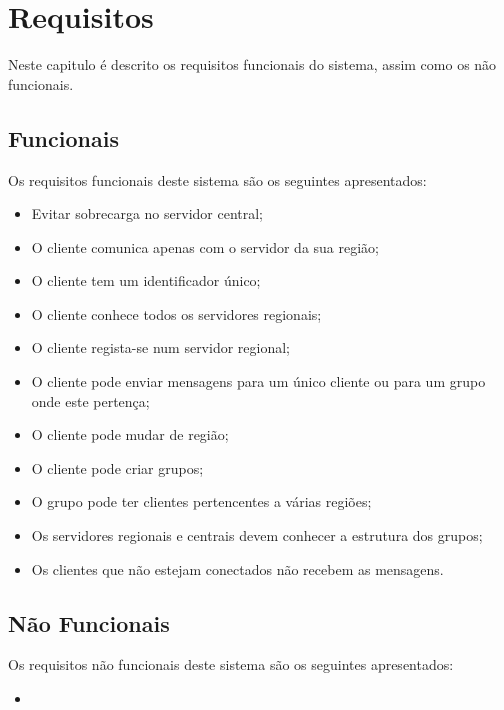 \chapter{Requisitos}
Neste capitulo é descrito os requisitos funcionais do sistema, assim como os não funcionais.
\section{Funcionais}
Os requisitos funcionais deste sistema são os seguintes apresentados:
\begin{itemize}
	\item Evitar sobrecarga no servidor central;
	\item O cliente comunica apenas com o servidor da sua região;
	\item O cliente tem um identificador único;
	\item O cliente conhece todos os servidores regionais;
	\item O cliente regista-se num servidor regional;
	\item O cliente pode enviar mensagens para um único cliente ou para um grupo onde este pertença;
	\item O cliente pode mudar de região;
	\item O cliente pode criar grupos;
	\item O grupo pode ter clientes pertencentes a várias regiões;
	\item Os servidores regionais e centrais devem conhecer a estrutura dos grupos;
	\item Os clientes que não estejam conectados não recebem as mensagens.
\end{itemize}
\section{Não Funcionais}
Os requisitos não funcionais deste sistema são os seguintes apresentados:
\begin{itemize}
	\item 
\end{itemize}